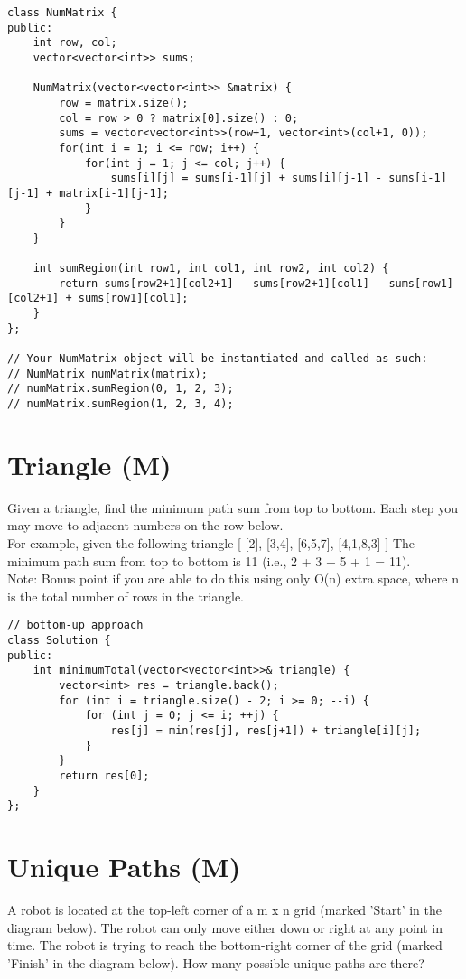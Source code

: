 \begin{lstlisting}
class NumMatrix {
public:
    int row, col;
    vector<vector<int>> sums;
    
    NumMatrix(vector<vector<int>> &matrix) {
        row = matrix.size();
        col = row > 0 ? matrix[0].size() : 0;
        sums = vector<vector<int>>(row+1, vector<int>(col+1, 0));
        for(int i = 1; i <= row; i++) {
            for(int j = 1; j <= col; j++) {
                sums[i][j] = sums[i-1][j] + sums[i][j-1] - sums[i-1][j-1] + matrix[i-1][j-1];
            }
        }
    }

    int sumRegion(int row1, int col1, int row2, int col2) {
        return sums[row2+1][col2+1] - sums[row2+1][col1] - sums[row1][col2+1] + sums[row1][col1];
    }
};

// Your NumMatrix object will be instantiated and called as such:
// NumMatrix numMatrix(matrix);
// numMatrix.sumRegion(0, 1, 2, 3);
// numMatrix.sumRegion(1, 2, 3, 4);
\end{lstlisting}


\section{Triangle (M)}
Given a triangle, find the minimum path sum from top to bottom. Each step you may move to adjacent numbers on the row below.\\

For example, given the following triangle
[
     [2],
    [3,4],
   [6,5,7],
  [4,1,8,3]
]
The minimum path sum from top to bottom is 11 (i.e., 2 + 3 + 5 + 1 = 11).\\

Note:
Bonus point if you are able to do this using only O(n) extra space, where n is the total number of rows in the triangle. \\

\begin{lstlisting}
// bottom-up approach
class Solution {
public:
    int minimumTotal(vector<vector<int>>& triangle) {
        vector<int> res = triangle.back();
        for (int i = triangle.size() - 2; i >= 0; --i) {
            for (int j = 0; j <= i; ++j) {
                res[j] = min(res[j], res[j+1]) + triangle[i][j];
            }
        }
        return res[0];
    }
};
\end{lstlisting}


\section{Unique Paths (M)}
A robot is located at the top-left corner of a m x n grid (marked 'Start' in the diagram below). The robot can only move either down or right at any point in time. The robot is trying to reach the bottom-right corner of the grid (marked 'Finish' in the diagram below). How many possible unique paths are there?\\

